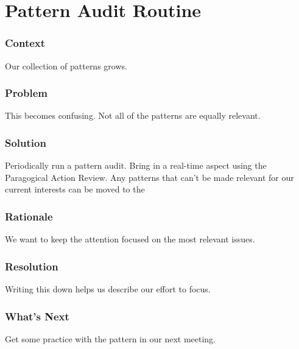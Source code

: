 \section{Pattern Audit Routine}\label{sec:Pattern_Audit}

\subsubsection*{Context} Our collection of patterns grows.

\subsubsection*{Problem} This becomes confusing.  Not all of the patterns are equally relevant.

\subsubsection*{Solution} Periodically run a pattern audit.  Bring in a real-time aspect using the Paragogical Action Review.  Any patterns that can't be made relevant for our current interests can be moved to the 

\subsubsection*{Rationale} We want to keep the attention focused on the most relevant issues.

\subsubsection*{Resolution} Writing this down helps us describe our effort to focus.

\subsubsection*{What's Next} Get some practice with the  pattern in our next meeting.


